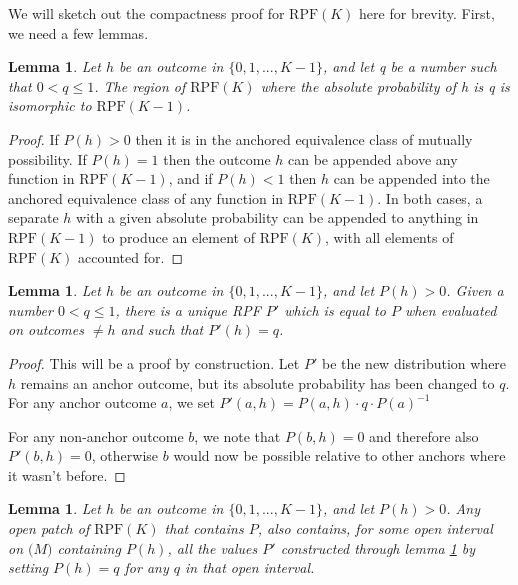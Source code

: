 \documentclass[twoside]{article}
\theoremstyle{plain}%
\newtheorem{lemma}[theorem]{Lemma}
\theoremstyle{definition}
\theoremstyle{remark}
\begin{document}
We will sketch out the compactness proof for \(\text{RPF}(K)\) here for brevity. First, we need a few lemmas.

\begin{lemma}
\label{lem:withhold_possible_outcome}
Let \(h\) be an outcome in \(\{0, 1, ..., K-1\}\), and let q be a number such that \(0 < q \leq 1\). The region of \(\text{RPF}(K)\) where the absolute probability of h is q is isomorphic to \(\text{RPF}(K-1)\).
\end{lemma}

\begin{proof}
If \(P(h) > 0\) then it is in the anchored equivalence class of mutually possibility. If \(P(h) = 1\) then the outcome \(h\) can be appended above any function in \(\text{RPF}(K - 1)\), and if \(P(h) < 1\) then \(h\) can be appended into the anchored equivalence class of any function in \(\text{RPF}(K-1)\). In both cases, a separate \(h\) with a given absolute probability can be appended to anything in \(\text{RPF}(K-1)\) to produce an element of \(\text{RPF}(K)\), with all elements of \(\text{RPF}(K)\) accounted for.
\end{proof}

\begin{lemma}
\label{lem:change_one_anchor_outcome}
Let \(h\) be an outcome in \(\{0, 1, ..., K-1\}\), and let \(P(h) > 0\). Given a number \(0 < q \leq 1\), there is a unique RPF \(P'\) which is equal to \(P\) when evaluated on outcomes \(\neq h\) and such that \(P'(h) = q\).
\end{lemma}

\begin{proof}
This will be a proof by construction. Let \(P'\) be the new distribution where \(h\) remains an anchor outcome, but its absolute probability has been changed to \(q\). For any anchor outcome \(a\), we set \(P'(a, h) = P(a, h) \cdot q \cdot P(a)^{-1} \)

For any non-anchor outcome \(b\), we note that \(P(b, h) = 0\) and therefore also \(P'(b, h) = 0\), otherwise \(b\) would now be possible relative to other anchors where it wasn't before.
\end{proof}

\begin{lemma}
\label{lem:open_anchor_outcome}
Let \(h\) be an outcome in \(\{0, 1, ..., K-1\}\), and let \(P(h) > 0\). Any open patch of \(\text{RPF}(K)\) that contains \(P\), also contains, for some open interval on \(\mathbb(M)\) containing \(P(h)\), all the values \(P'\) constructed through lemma \ref{lem:change_one_anchor_outcome} by setting \(P(h) = q\) for any \(q\) in that open interval.
\end{lemma}
\end{document}
